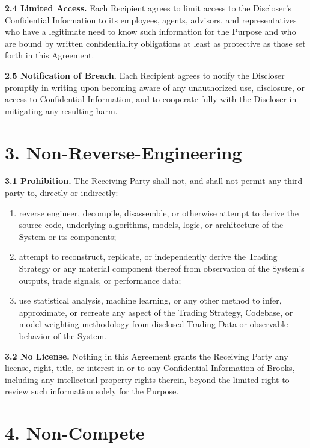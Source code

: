 \documentclass{article}
\begin{document}
\textbf{2.4 Limited Access.} Each Recipient agrees to limit access to the Discloser's Confidential Information to its employees, agents, advisors, and representatives who have a legitimate need to know such information for the Purpose and who are bound by written confidentiality obligations at least as protective as those set forth in this Agreement.

\textbf{2.5 Notification of Breach.} Each Recipient agrees to notify the Discloser promptly in writing upon becoming aware of any unauthorized use, disclosure, or access to Confidential Information, and to cooperate fully with the Discloser in mitigating any resulting harm.

\section{3. Non-Reverse-Engineering}

\textbf{3.1 Prohibition.} The Receiving Party shall not, and shall not permit any third party to, directly or indirectly:

\begin{enumerate}[label=(\alph*), leftmargin=2em]
\item reverse engineer, decompile, disassemble, or otherwise attempt to derive the source code, underlying algorithms, models, logic, or architecture of the System or its components;

\item attempt to reconstruct, replicate, or independently derive the Trading Strategy or any material component thereof from observation of the System's outputs, trade signals, or performance data;

\item use statistical analysis, machine learning, or any other method to infer, approximate, or recreate any aspect of the Trading Strategy, Codebase, or model weighting methodology from disclosed Trading Data or observable behavior of the System.
\end{enumerate}

\textbf{3.2 No License.} Nothing in this Agreement grants the Receiving Party any license, right, title, or interest in or to any Confidential Information of Brooks, including any intellectual property rights therein, beyond the limited right to review such information solely for the Purpose.

\section{4. Non-Compete}
\end{document}

